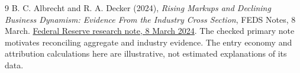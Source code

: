 \documentclass[11pt,a4paper]{article}
\begin{document}
\begin{thebibliography}{9}
 B. C. Albrecht and R. A. Decker (2024), \emph{Rising Markups and Declining Business Dynamism: Evidence From the Industry Cross Section}, FEDS Notes, 8 March. \href{https://www.federalreserve.gov/econres/notes/feds-notes/rising-markups-and-declining-business-dynamism-evidence-from-the-industry-cross-section-20240308.html}{Federal Reserve research note, 8 March 2024}. The checked primary note motivates reconciling aggregate and industry evidence. The entry economy and attribution calculations here are illustrative, not estimated explanations of its data.
\end{thebibliography}
\end{document}
